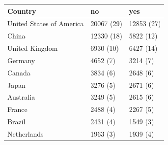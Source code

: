 \begin{table}[ht]
\centering
\begin{tabular}{lll}
 Country & no & yes \\ 
  \hline
United States of America & 20067 (29) & 12853 (27) \\ 
  China & 12330 (18) & 5822 (12) \\ 
  United Kingdom & 6930 (10) & 6427 (14) \\ 
  Germany & 4652 (7) & 3214 (7) \\ 
  Canada & 3834 (6) & 2648 (6) \\ 
  Japan & 3276 (5) & 2671 (6) \\ 
  Australia & 3249 (5) & 2615 (6) \\ 
  France & 2488 (4) & 2267 (5) \\ 
  Brazil & 2431 (4) & 1549 (3) \\ 
  Netherlands & 1963 (3) & 1939 (4) \\ 
  \end{tabular}
\end{table}
